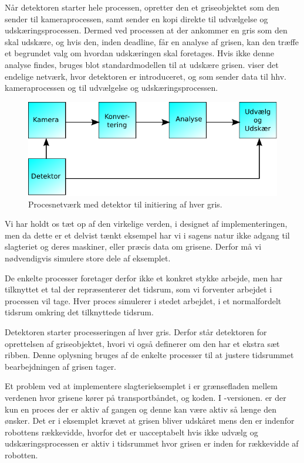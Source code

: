 Når detektoren starter hele processen, opretter den et griseobjektet som den sender til kameraprocessen, samt sender en kopi direkte til udvælgelse og udskæringsprocessen. Dermed ved processen at der ankommer en gris som den skal udskære, og hvis den, inden deadline, får en analyse af grisen, kan den træffe et begrundet valg om hvordan udskæringen skal foretages. Hvis ikke denne analyse findes, bruges blot standardmodellen til at udskære grisen.  viser det endelige  netværk, hvor detektoren er introduceret, og som sender data til hhv. kameraprocessen og til udvælgelse og udskæringsprocessen. 

\begin{figure}
 \begin{center}
  \includegraphics[scale=1]{images/pig-network2}
	\caption{Procesnetværk med detektor til initiering af hver gris.}
	\label{fig:pig-network2}
\end{center}
\end{figure}

Vi har holdt os tæt op af den virkelige verden, i designet af implementeringen, men da dette er et delvist tænkt eksempel har vi i  sagens natur ikke  adgang til slagteriet og deres maskiner, eller præcis data om grisene. Derfor må vi nødvendigvis simulere store dele af eksemplet. 

De enkelte processer foretager derfor ikke et konkret stykke arbejde, men har  tilknyttet et tal der repræsenterer det tidsrum, som vi forventer arbejdet i processen vil tage. Hver proces simulerer i stedet arbejdet, i et normalfordelt tidsrum omkring det tilknyttede tidsrum.

Detektoren starter processeringen af hver gris. Derfor står detektoren for oprettelsen af griseobjektet, hvori vi også  definerer om den har et ekstra sæt ribben. Denne oplysning bruges af de enkelte processer til at justere tidsrummet bearbejdningen af grisen tager. 

Et problem ved at implementere slagterieksemplet i \pycsp er  grænsefladen mellem verdenen hvor grisene kører på transportbåndet, og  koden. I -versionen.   er der kun  en proces  der er aktiv af gangen og denne kan være aktiv så længe den ønsker. Det er i eksemplet  krævet at  grisen bliver udskåret mens den er indenfor robottens rækkevidde, hvorfor det er uacceptabelt hvis ikke udvælg og udskæringsprocessen er aktiv i tidsrummet hvor grisen er inden for rækkevidde af robotten. 

